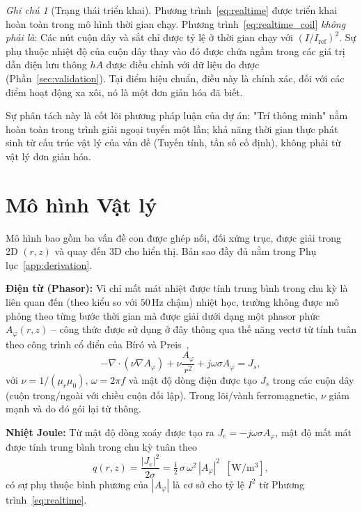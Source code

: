 \documentclass[a4paper, 10pt, conference]{ieeeconf}
\theoremstyle{remark}
\newtheorem{remark}{Ghi chú}
\begin{document}
\begin{remark}[Trạng thái triển khai]
\label{rem:sigma}
Phương trình~\eqref{eq:realtime} được triển khai hoàn toàn trong mô hình thời gian
chạy. Phương trình~\eqref{eq:realtime_coil} \emph{không phải là}: Các nút cuộn dây
và sắt chỉ được tỷ lệ ở thời gian chạy với $(I/I_{\mathrm{ref}})^2$. Sự phụ thuộc
nhiệt độ của cuộn dây thay vào đó được chứa ngầm trong các giá trị dẫn điện lưu
thông $hA$ được điều chỉnh với dữ liệu đo được (Phần~\ref{sec:validation}). Tại
điểm hiệu chuẩn, điều này là chính xác, đối với các điểm hoạt động xa xôi, nó là
một đơn giản hóa đã biết.
\end{remark}

Sự phân tách này là cốt lõi phương pháp luận của dự án: "Trí thông minh" nằm hoàn
toàn trong trình giải ngoại tuyến một lần; khả năng thời gian thực phát sinh từ cấu
trúc vật lý của vấn đề (Tuyến tính, tần số cố định), không phải từ vật lý đơn giản
hóa.


\section{Mô hình Vật lý}
\label{sec:physics}

Mô hình bao gồm ba vấn đề con được ghép nối, đối xứng trục, được giải trong 2D
$(r,z)$ và quay đến 3D cho hiển thị. Bản sao đầy đủ nằm trong Phụ lục~\ref{app:derivation}.

\textbf{Điện từ (Phasor):} Vì chỉ mất mát nhiệt được tính trung bình trong chu kỳ
là liên quan đến (theo kiểu so với $50\,\mathrm{Hz}$ chậm) nhiệt học, trường không
được mô phỏng theo từng bước thời gian mà được giải dưới dạng một phasor phức
$A_\varphi(r,z)$ -- công thức được sử dụng ở đây thông qua thế năng vectơ từ tính
tuân theo công trình cổ điển của Bíró và Preis~\cite{biro1989vectorpotential},
\begin{equation}
  -\nabla\!\cdot\!\left(\nu\nabla A_\varphi\right)
  + \nu\frac{A_\varphi}{r^{2}} + j\omega\sigma A_\varphi = J_s,
  \label{eq:em}
\end{equation}
với $\nu=1/(\mu_r\mu_0)$, $\omega=2\pi f$ và mật độ dòng điện được tạo $J_s$
trong các cuộn dây (cuộn trong/ngoài với chiều cuộn đối lập). Trong lõi/vành
ferromạgnetic, $\nu$ giảm mạnh và do đó gói lại từ thông.

\textbf{Nhiệt Joule:} Từ mật độ dòng xoáy được tạo ra $J_e=-j\omega\sigma A_\varphi$,
mật độ mất mát được tính trung bình trong chu kỳ tuân theo
\begin{equation}
  q(r,z) = \frac{|J_e|^{2}}{2\sigma}
         = \tfrac12\,\sigma\,\omega^{2}\,|A_\varphi|^{2}\ \;[\mathrm{W/m^3}],
  \label{eq:loss}
\end{equation}
có sự phụ thuộc bình phương của $|A_\varphi|$ là cơ sở cho tỷ lệ $I^2$ từ Phương
trình~\eqref{eq:realtime}.
\end{document}
